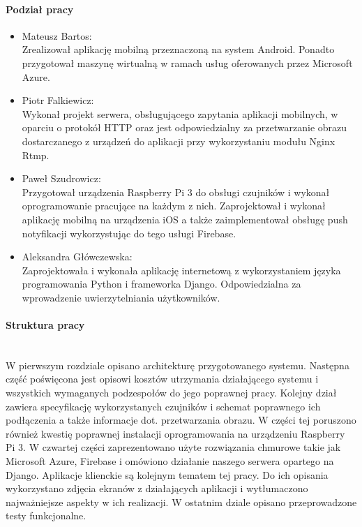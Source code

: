 \paragraph{Podział pracy}
\begin{itemize}
\item Mateusz Bartos: \\
Zrealizował aplikację mobilną przeznaczoną na system Android. Ponadto przygotował maszynę wirtualną w ramach usług oferowanych przez Microsoft Azure.
\item Piotr Falkiewicz: \\
Wykonał projekt serwera, obsługującego zapytania aplikacji mobilnych, w oparciu o protokół HTTP oraz jest odpowiedzialny za przetwarzanie obrazu dostarczanego z urządzeń do aplikacji przy wykorzystaniu modułu Nginx Rtmp. 
\item Paweł Szudrowicz: \\
Przygotował urządzenia Raspberry Pi 3 do obsługi czujników i wykonał oprogramowanie pracujące na każdym z nich. Zaprojektował i wykonał aplikację mobilną na urządzenia iOS a także zaimplementował obsługę push notyfikacji wykorzystując do tego usługi Firebase.
\item Aleksandra Główczewska: \\
Zaprojektowała i wykonała aplikację internetową z wykorzystaniem języka programowania Python i frameworka Django. Odpowiedzialna za wprowadzenie uwierzytelniania użytkowników.
\end{itemize}

\paragraph{Struktura pracy} \\
W pierwszym rozdziale opisano architekturę przygotowanego systemu. Następna część poświęcona jest opisowi kosztów utrzymania działającego systemu i wszystkich wymaganych podzespołów do jego poprawnej pracy. Kolejny dział zawiera specyfikację wykorzystanych czujników i schemat poprawnego ich podłączenia a także informacje dot. przetwarzania obrazu. W części tej poruszono również kwestię poprawnej instalacji oprogramowania na urządzeniu Raspberry Pi 3.  W czwartej części zaprezentowano użyte rozwiązania chmurowe takie jak Microsoft Azure, Firebase i omówiono działanie naszego serwera opartego na Django. Aplikacje klienckie są kolejnym tematem tej pracy. Do ich opisania wykorzystano zdjęcia ekranów z działających aplikacji i wytłumaczono najważniejsze aspekty w ich realizacji. W ostatnim dziale opisano przeprowadzone testy funkcjonalne.